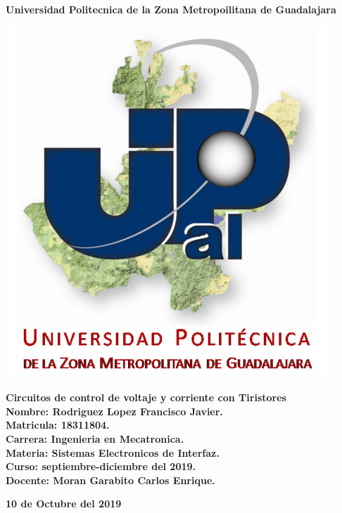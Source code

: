 \documentclass[12pt,a4paper]{article}
\author{Rodriguez Lopez Francisco Javier}
\begin{document}
\begin{center}
\LARGE \textbf{Universidad Politecnica de la Zona Metropoilitana de Guadalajara\\}


\includegraphics[scale=1]{Upzmge.png} 

\large \textbf{Circuitos de control de voltaje y corriente con Tiristores}\\
\vspace{2cm}
\large \textbf{Nombre: Rodriguez Lopez Francisco Javier.\\
\vspace{0.5cm} Matricula: 18311804.\\
\vspace{0.5cm} Carrera: Ingenieria en Mecatronica.\\
\vspace{0.5cm} Materia: Sistemas Electronicos de Interfaz.\\
\vspace{0.5cm} Curso: septiembre-diciembre del 2019.\\
\vspace{0.5cm} Docente: Moran Garabito Carlos Enrique.}


\vspace{6cm}
\small \textbf{10 de Octubre del 2019}
\end{center}
\end{document}
